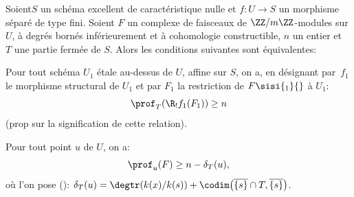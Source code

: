 \setcounter{subsection}{1}

\begin{theoreme} \label{XIV.4.2}
Soient\pageoriginale $S$ un sch\'ema excellent de caract\'eristique nulle et \hbox{$f\colon U\!\to\! S$} un morphisme s\'epar\'e de type fini. Soient $F$ un complexe de faisceaux de $\ZZ/m\ZZ$-modules sur $U$, \`a degr\'es born\'es inf\'erieurement et \`a cohomologie constructible, $n$ un entier et~$T$ une partie ferm\'ee de $S$. Alors les conditions suivantes sont \'equivalentes:
\begin{enumeratei}
\item
Pour tout sch\'ema $U_{1}$ \'etale au-dessus de $U$, affine sur $S$, on a, en d\'esignant par~$f_{1}$ le morphisme structural de $U_{1}$ et par $F_{1}$ la restriction de $F\sisi{_{1}}{}$ \`a $U_{1}$:
$$
\prof_{T}(\R_{!}f_{1}(F_{1}))\geq n$$
(\cf prop\ptbl {} sur la signification de cette relation).
\item
Pour tout point $u$ de $U$, on a:
$$
\prof_{u}(F)\geq n-\delta_{T}(u),
$$
o\`u l'on pose (\cf {}): $\delta_{T}(u)=\degtr(k(x)/k(s))+\codim\big(\overline{\{ s\} }\cap T, \overline{\{ s\} } \big)$.
\end{enumeratei}
\end{theoreme}

